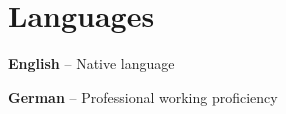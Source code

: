 \section{Languages}
\begin{small}
	\parbox[t][][t]{\linewidth}{
		\textbf{English} -- Native language
		\smallbreak
	}
	\parbox[t][][t]{\linewidth}{
		\textbf{German} -- Professional working proficiency
	}
\end{small}

